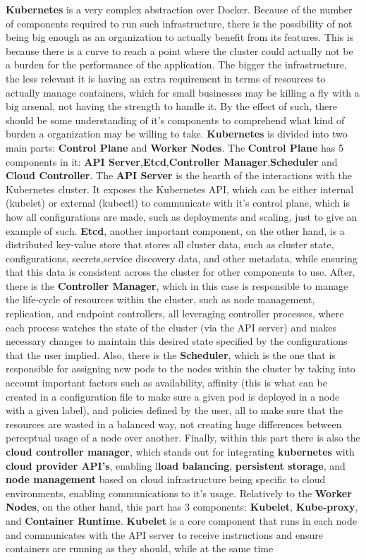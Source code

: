 \textbf{Kubernetes} is a very complex abstraction over Docker. Because of the number of components required to run such infrastructure, there is the possibility of not being big enough as an organization to actually benefit from its features. This is because there is a curve to reach a point where the cluster could actually not be a burden for the performance of the application. The bigger the infrastructure, the less relevant it is having an extra requirement in terms of resources to actually manage containers, which for small businesses may be killing a fly with a big arsenal, not having the strength to handle it. By the effect of such, there should be some understanding of it's components to comprehend what kind of burden a organization may be willing to take. \textbf{Kubernetes} is divided into two main parts: \textbf{Control Plane} and \textbf{Worker Nodes}. The \textbf{Control Plane} has 5 components in it: \textbf{API Server},\textbf{Etcd},\textbf{Controller Manager},\textbf{Scheduler} and \textbf{Cloud Controller}. The \textbf{API Server} is the hearth of the interactions with the Kubernetes cluster. It exposes the Kubernetes API, which can be either internal (kubelet) or external (kubectl) to communicate with it's control plane, which is how all configurations are made, such as deployments and scaling, just to give an example of such. \textbf{Etcd}, another important component, on the other hand, is a distributed key-value store that stores all cluster data, such as cluster state, configurations, secrets,service discovery data, and other metadata, while ensuring that this data is consistent across the cluster for other components to use. After, there is the \textbf{Controller Manager}, which in this case is responsible to manage the life-cycle of resources within the cluster, such as node management, replication, and endpoint controllers, all leveraging controller processes, where each process watches the state of the cluster (via the API server) and makes necessary changes to maintain this desired state specified by the configurations that the user implied. Also, there is the \textbf{Scheduler}, which is the one that is responsible for assigning new pods to the nodes within the cluster by taking into account important factors such as availability, affinity (this is what can be created in a configuration file to make sure a given pod is deployed in a node with a given label), and policies defined by the user, all to make sure that the resources are wasted in a balanced way, not creating huge differences between perceptual usage of a node over another. Finally, within this part there is also the \textbf{cloud controller manager}, which stands out for integrating \textbf{kubernetes} with \textbf{cloud provider API's}, enabling l\textbf{load balancing}, \textbf{persistent storage}, and \textbf{node management} based on cloud infrastructure being specific to cloud environments, enabling communications to it's usage. Relatively to the \textbf{Worker Nodes}, on the other hand, this part has 3 components: \textbf{Kubelet}, \textbf{Kube-proxy}, and \textbf{Container Runtime}. \textbf{Kubelet} is a core component that runs in each node and communicates with the API server to receive instructions and ensure containers are running as they should, while at the same time 